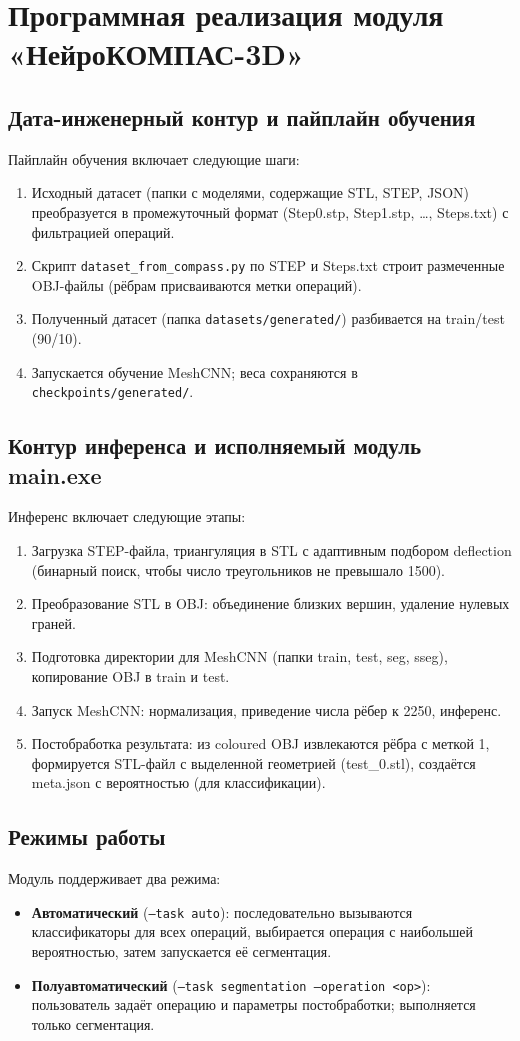 \section{Программная реализация модуля «НейроКОМПАС-3D»}

\subsection{Дата-инженерный контур и пайплайн обучения}
Пайплайн обучения включает следующие шаги:
\begin{enumerate}
    \item Исходный датасет (папки с моделями, содержащие STL, STEP, JSON) преобразуется в промежуточный формат (Step0.stp, Step1.stp, …, Steps.txt) с фильтрацией операций.
    \item Скрипт \texttt{dataset\_from\_compass.py} по STEP и Steps.txt строит размеченные OBJ-файлы (рёбрам присваиваются метки операций).
    \item Полученный датасет (папка \texttt{datasets/generated/}) разбивается на train/test (90/10).
    \item Запускается обучение MeshCNN; веса сохраняются в \texttt{checkpoints/generated/}.
\end{enumerate}

\subsection{Контур инференса и исполняемый модуль main.exe}
Инференс включает следующие этапы:
\begin{enumerate}
    \item Загрузка STEP-файла, триангуляция в STL с адаптивным подбором deflection (бинарный поиск, чтобы число треугольников не превышало 1500).
    \item Преобразование STL в OBJ: объединение близких вершин, удаление нулевых граней.
    \item Подготовка директории для MeshCNN (папки train, test, seg, sseg), копирование OBJ в train и test.
    \item Запуск MeshCNN: нормализация, приведение числа рёбер к 2250, инференс.
    \item Постобработка результата: из coloured OBJ извлекаются рёбра с меткой 1, формируется STL-файл с выделенной геометрией (test\_0.stl), создаётся meta.json с вероятностью (для классификации).
\end{enumerate}

\subsection{Режимы работы}
Модуль поддерживает два режима:
\begin{itemize}
    \item \textbf{Автоматический} (\texttt{--task auto}): последовательно вызываются классификаторы для всех операций, выбирается операция с наибольшей вероятностью, затем запускается её сегментация.
    \item \textbf{Полуавтоматический} (\texttt{--task segmentation --operation <op>}): пользователь задаёт операцию и параметры постобработки; выполняется только сегментация.
\end{itemize}

